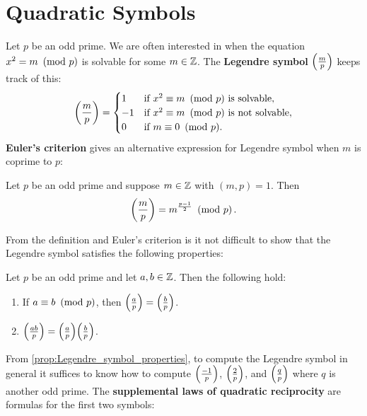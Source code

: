   \section{Quadratic Symbols}\label{append:Quadratic_Symbols}
    Let $p$ be an odd prime. We are often interested in when the equation $x^{2} = m \ \left(\text{mod }p\right)$ is solvable for some $m \in \mathbb{Z}$. The \textbf{Legendre symbol} $\textstyle{\left(\frac{m}{p}\right)}$ keeps track of this:
    \[
      \left(\frac{m}{p}\right) = \begin{cases} 1 & \text{if $x^{2} \equiv m \ \left(\text{mod }p\right)$ is solvable}, \\ -1 & \text{if $x^{2} \equiv m \ \left(\text{mod }p\right)$ is not solvable}, \\ 0 & \text{if $m \equiv 0 \ \left(\text{mod }p\right)$}. \end{cases}
    \]
    \textbf{Euler's criterion} gives an alternative expression for Legendre symbol when $m$ is coprime to $p$:
    \begin{proposition}
      Let $p$ be an odd prime and suppose $m \in \mathbb{Z}$ with $(m,p) = 1$. Then
      \[
        \left(\frac{m}{p}\right) = m^{\frac{p-1}{2}} \ \left(\text{mod }p\right).
      \]
    \end{proposition}
    From the definition and Euler's criterion is it not difficult to show that the Legendre symbol satisfies the following properties:
    \begin{proposition}\label{prop:Legendre_symbol_properties}
      Let $p$ be an odd prime and let $a,b \in \mathbb{Z}$. Then the following hold:
      \begin{enumerate}[label=(\roman*)]
        \item If $a \equiv b \ \left(\text{mod }p\right)$, then $\textstyle{\left(\frac{a}{p}\right)} = \textstyle{\left(\frac{b}{p}\right)}$.
        \item $\textstyle{\left(\frac{ab}{p}\right)} = \textstyle{\left(\frac{a}{p}\right)}\textstyle{\left(\frac{b}{p}\right)}$.
      \end{enumerate}
    \end{proposition}
    From \cref{prop:Legendre_symbol_properties}, to compute the Legendre symbol in general it suffices to know how to compute $\textstyle{\left(\frac{-1}{p}\right)}$, $\textstyle{\left(\frac{2}{p}\right)}$, and $\textstyle{\left(\frac{q}{p}\right)}$ where $q$ is another odd prime. The \textbf{supplemental laws of quadratic reciprocity} are formulas for the first two symbols:
